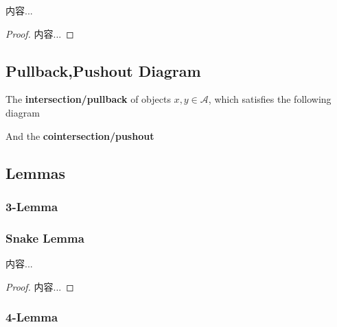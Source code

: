\documentclass[Total.tex]{subfiles}
\begin{document}
			\begin{theorem}
				内容...
			\end{theorem}
			\begin{proof}
				内容...
			\end{proof}
			\subsection{Pullback,Pushout Diagram}
					\begin{Def}
						The \textbf{intersection/pullback} of objects $x,y\in \mathcal{A}$, which satisfies the following diagram
						\begin{center}
						\end{center}
						And the \textbf{cointersection/pushout}
						\begin{center}
						\end{center}
					\end{Def}
				\subsection{Lemmas}
					\subsubsection{3-Lemma}
					\subsubsection{Snake Lemma}
						\begin{proposition}
							内容...
						\end{proposition}
						\begin{proof}
							内容...
						\end{proof}
					\subsubsection{4-Lemma}
\end{document}
